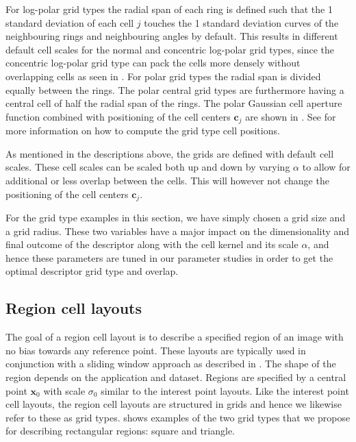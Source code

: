 \documentclass[thesis.tex]{subfiles}
\def\x{\mathbf{x}}
\def\c{\mathbf{c}}
\begin{document}
For log-polar grid types the radial span of each ring is defined such that the 1 standard deviation of each cell $j$ touches the 1 standard deviation curves of the neighbouring rings and neighbouring angles by default. This results in different default cell scales for the normal and concentric log-polar grid types, since the concentric log-polar grid type can pack the cells more densely without overlapping cells as seen in .
For polar grid types the radial span is divided equally between the rings. The polar central grid types are furthermore having a central cell of half the radial span of the rings. The polar Gaussian cell aperture function combined with positioning of the cell centers $\c_j$ are shown in .
See  for more information on how to compute the grid type cell positions.

As mentioned in the descriptions above, the grids are defined with default cell scales. These cell scales can be scaled both up and down by varying $\alpha$ to allow for additional or less overlap between the cells. This will however not change the positioning of the cell centers $\c_j$.

For the grid type examples in this section, we have simply chosen a grid size and a grid radius. These two variables have a major impact on the dimensionality and final outcome of the descriptor along with the cell kernel and its scale $\alpha$, and hence these parameters are tuned in our parameter studies in order to get the optimal descriptor grid type and overlap.

\subsection{Region cell layouts}
\label{sec:cellApertureFunctionRegion}

The goal of a region cell layout is to describe a specified region of an image with no bias towards any reference point. These layouts are typically used in conjunction with a sliding window approach as described in . The shape of the region depends on the application and dataset. Regions are specified by a central point $\x_0$ with scale $\sigma_0$ similar to the interest point layouts. Like the interest point cell layouts, the region cell layouts are structured in grids and hence we likewise refer to these as grid types.
 shows examples of the two grid types that we propose for describing rectangular regions: square and triangle.
\end{document}
